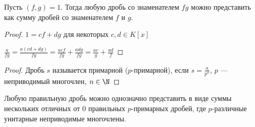 \begin{lemma}
    Пусть $(f, g) = 1$. Тогда любую дробь со знаменателем $fg$ можно представить как сумму дробей со знаменателем $f$ и $g$.
\end{lemma}

\begin{proof}
    $1 = cf + dg$ для некоторых $c, d \in K[x]$

    $\frac{a}{fg} = \frac{a(cd + dg)}{fg} = \frac{acf}{fg} + \frac{adg}{fg} = \frac{ac}{g} + \frac{ad}{f}$
\end{proof}

\begin{proof}
    Дробь $s$ называется примарной ($p$-примарной), если $s = \frac{a}{p^n}$, $p$ --- неприводимый многочлен, $n \in \N$
\end{proof}

\begin{theorem-non}
    Любую правильную дробь можно однозначно представить в виде суммы нескольких отличных от $0$ правильных $p$-примарных дробей, где $p$-различные унитарные неприводимые многочлены.
\end{theorem-non}

